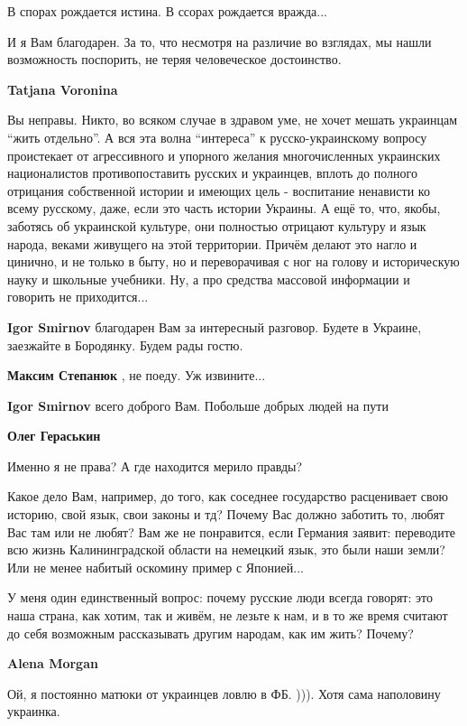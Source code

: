 \begin{itemize}
\begin{itemize}
В спорах рождается истина. В ссорах рождается вражда...

И я Вам благодарен. За то, что несмотря на различие во взглядах, мы нашли
возможность поспорить, не теряя человеческое достоинство.

\textbf{Tatjana Voronina} 

Вы неправы. Никто, во всяком случае в здравом уме, не хочет мешать украинцам
\enquote{жить отдельно}. А вся эта волна \enquote{интереса} к русско-украинскому вопросу
проистекает от агрессивного и упорного желания многочисленных украинских
националистов противопоставить русских и украинцев, вплоть до полного отрицания
собственной истории и имеющих цель - воспитание ненависти ко всему русскому,
даже, если это часть истории Украины. А ещё то, что, якобы, заботясь об
украинской культуре, они полностью отрицают культуру и язык народа, веками
живущего на этой территории. Причём делают это нагло и цинично, и не только в
быту, но и переворачивая с ног на голову и историческую науку и школьные
учебники. Ну, а про средства массовой информации и говорить не приходится...


\textbf{Igor Smirnov} благодарен Вам за интересный разговор. Будете в Украине, заезжайте в Бородянку. Будем рады гостю.

\textbf{Максим Степанюк} , не поеду. Уж извините...

\textbf{Igor Smirnov} всего доброго Вам. Побольше добрых людей на пути

\textbf{Олег Гераськин}

Именно я не права? А где находится мерило правды?

Какое дело Вам, например, до того, как соседнее государство расценивает свою
историю, свой язык, свои законы и тд? Почему Вас должно заботить то, любят Вас
там или не любят? Вам же не понравится, если Германия заявит: переводите всю
жизнь Калининградской области на немецкий язык, это были наши земли? Или не
менее набитый оскомину пример с Японией...

У меня один единственный вопрос: почему русские люди всегда говорят: это наша
страна, как хотим, так и живём, не лезьте к нам, и в то же время считают до
себя возможным рассказывать другим народам, как им жить? Почему?

\textbf{Alena Morgan} 

Ой, я постоянно матюки от украинцев ловлю в ФБ. ))). Хотя сама наполовину
украинка.


\end{itemize}
\end{itemize}

